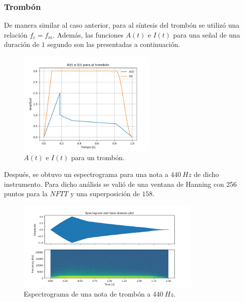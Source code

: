 \subsubsection{Trombón}
De manera similar al caso anterior, para al síntesis del trombón se utilizó una relación $f_c = f_m$. Además, las funciones $A(t)$ e $I(t)$ para una señal de una duración de $1$ segundo son las presentadas a continuación.
\begin{figure}[H]
	\centering
	\includegraphics[width=0.6\textwidth]{ImagenesEjercicio3/A-I-Trombone.png}
	\caption{$A(t)$ e $I(t)$ para un trombón.}
	\label{fig:aitromb}
\end{figure}

Después, se obtuvo un espectrograma para una nota a $440 \ Hz$ de dicho instrumento. Para dicho análisis se valió de una ventana de Hanning con 256 puntos para la $NFTT$ y una superposición de $158$.  
\begin{figure}[H]
	\centering
	\includegraphics[width=0.8\textwidth]{ImagenesEjercicio3/Trombone-440-Hanning-256-158.png}
	\caption{Espectrograma de una nota de trombón a $440 \ Hz$.}
	\label{fig:spectromb}
\end{figure}

